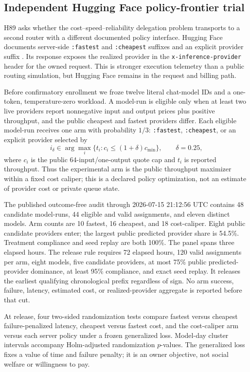 \documentclass[11pt]{article}
\theoremstyle{definition}
\begin{document}
\subsection{Independent Hugging Face policy-frontier trial}

H89 asks whether the cost--speed--reliability delegation problem transports to
a second router with a different documented policy interface. Hugging Face
documents server-side \texttt{:fastest} and \texttt{:cheapest} suffixes and an
explicit provider suffix \cite{hfinferenceproviders2026}. Its response exposes
the realized provider in the \texttt{x-inference-provider} header for the owned
request. This is stronger execution telemetry than a public routing simulation,
but Hugging Face remains in the request and billing path.

Before confirmatory enrollment we froze twelve literal chat-model IDs and a
one-token, temperature-zero workload. A model-run is eligible only when at
least two live providers report nonnegative input and output prices plus
positive throughput, and the public cheapest and fastest providers differ.
Each eligible model-run receives one arm with probability $1/3$:
\texttt{:fastest}, \texttt{:cheapest}, or an explicit provider selected by
\[
 i_{\delta}\in\arg\max_i\{t_i:c_i\leq(1+\delta)c_{\min}\},
 \qquad \delta=0.25,
\]
where $c_i$ is the public 64-input/one-output quote cap and $t_i$ is reported
throughput. Thus the experimental arm is the public throughput maximizer within
a fixed cost caliper; this is a declared policy optimization, not an estimate
of provider cost or private queue state.

The published outcome-free audit through 2026-07-15 21:12:56 UTC contains 48
candidate model-runs, 44 eligible and valid assignments, and eleven distinct
models. Arm counts are 10 fastest, 16 cheapest, and 18 cost-caliper. Eight
public candidate providers enter; the largest public predicted provider share
is 54.5\%. Treatment compliance and seed replay are both 100\%. The panel spans
three elapsed hours. The release rule requires 72 elapsed hours, 120 valid
assignments per arm, eight models, five candidate providers, at most 75\%
public predicted-provider dominance, at least 95\% compliance, and exact seed
replay. It releases the earliest qualifying chronological prefix regardless of
sign. No arm success, failure, latency, estimated cost, or realized-provider
aggregate is reported before that cut.

At release, four two-sided randomization tests compare fastest versus cheapest
failure-penalized latency, cheapest versus fastest cost, and the cost-caliper
arm versus each server policy under a frozen generalized loss. Model-day
cluster intervals accompany Holm-adjusted randomization $p$-values. The
generalized loss fixes a value of time and failure penalty; it is an owner
objective, not social welfare or willingness to pay.
\end{document}
